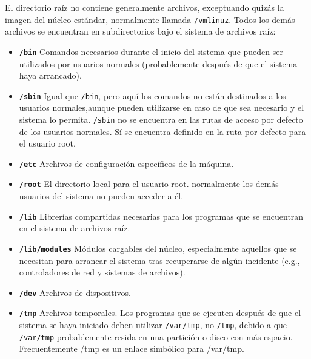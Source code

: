 \documentclass[12pt]{article}
\begin{document}
 El directorio raíz no contiene generalmente archivos, exceptuando quizás
la imagen del núcleo estándar, normalmente llamada
\texttt{/vmlinuz}.  Todos los demás archivos se encuentran en
subdirectorios bajo el sistema de archivos raíz:

\begin{itemize} 

	\item \textbf{\texttt{/bin}}
	 Comandos necesarios durante el inicio del sistema que
	pueden ser utilizados por usuarios normales (probablemente después de
	que el sistema haya arrancado).  

	\item \textbf{\texttt{/sbin}}
	 Igual que \texttt{/bin}, pero aquí los
	comandos 	no están destinados a los usuarios normales,aunque
	pueden utilizarse en caso de que sea necesario y el sistema lo permita.
	\texttt{/sbin} no se encuentra en las rutas de acceso por
	defecto de los usuarios normales. Sí se encuentra definido en la ruta
	por 		defecto para el usuario root.
	


	\item \textbf{\texttt{/etc}}
	 Archivos de configuración específicos de la máquina.
	

	
	\item \textbf{\texttt{/root}}
	 El directorio local para el usuario root.  normalmente
	los demás usuarios del sistema no pueden acceder a él.
	


	\item \textbf{\texttt{/lib}}
	 Librerías compartidas necesarias para los programas que
	se encuentran en el sistema de archivos raíz.
	


	\item \textbf{\texttt{/lib/modules}}
	 Módulos cargables del núcleo, especialmente
	aquellos que se necesitan para arrancar el sistema tras recuperarse
	de algún incidente (e.g., controladores de red y sistemas de
	archivos).


	\item \textbf{\texttt{/dev}}
	 Archivos de dispositivos.


	\item \textbf{\texttt{/tmp}}
	 Archivos temporales. Los programas que se ejecuten
	después de que el sistema se haya iniciado deben utilizar
	\texttt{/var/tmp}, no \texttt{/tmp},
	debido a que \texttt{/var/tmp} probablemente resida en una
	partición o disco con más espacio. Frecuentemente /tmp es un enlace
	simbólico para /var/tmp.  



\end{itemize}
\end{document}
